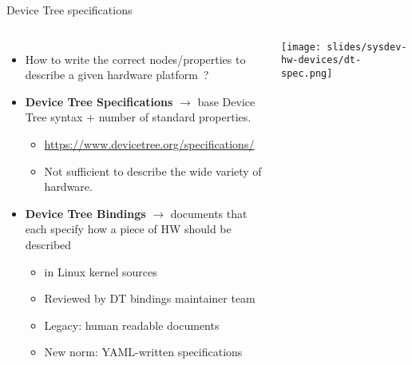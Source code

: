 \begin{frame}{Device Tree specifications}
  \begin{columns}
    \begin{itemize}
    \item How to write the correct nodes/properties to describe a
      given hardware platform~?
    \item {\bf Device Tree Specifications} $\rightarrow$ base Device
      Tree syntax + number of standard properties.
      \begin{itemize}
      \item \url{https://www.devicetree.org/specifications/}
      \item Not sufficient to describe the wide variety of hardware.
      \end{itemize}
    \item {\bf Device Tree Bindings} $\rightarrow$ documents that each
      specify how a piece of HW should be described
      \begin{itemize}
      \item {} in Linux kernel sources
      \item Reviewed by DT bindings maintainer team
      \item Legacy: human readable documents
      \item New norm: YAML-written specifications
      \end{itemize}
    \end{itemize}
    \texttt{[image: slides/sysdev-hw-devices/dt-spec.png]}
  \end{columns}
\end{frame}

